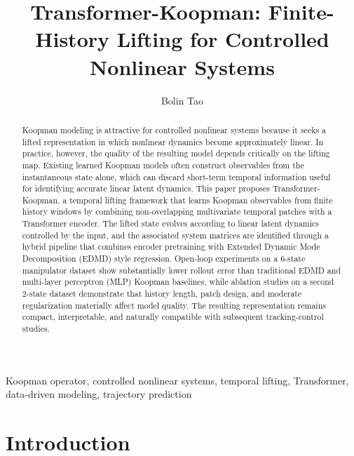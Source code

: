 \documentclass[journal]{IEEEtran}
\begin{document}
\title{Transformer-Koopman: Finite-History Lifting for Controlled Nonlinear Systems}

\author{Bolin Tao}


\maketitle

\begin{abstract}
Koopman modeling is attractive for controlled nonlinear systems because it seeks a lifted representation in which nonlinear dynamics become approximately linear. In practice, however, the quality of the resulting model depends critically on the lifting map. Existing learned Koopman models often construct observables from the instantaneous state alone, which can discard short-term temporal information useful for identifying accurate linear latent dynamics. This paper proposes Transformer-Koopman, a temporal lifting framework that learns Koopman observables from finite history windows by combining non-overlapping multivariate temporal patches with a Transformer encoder. The lifted state evolves according to linear latent dynamics controlled by the input, and the associated system matrices are identified through a hybrid pipeline that combines encoder pretraining with Extended Dynamic Mode Decomposition (EDMD) style regression. Open-loop experiments on a 6-state manipulator dataset show substantially lower rollout error than traditional EDMD and multi-layer perceptron (MLP) Koopman baselines, while ablation studies on a second 2-state dataset demonstrate that history length, patch design, and moderate regularization materially affect model quality. The resulting representation remains compact, interpretable, and naturally compatible with subsequent tracking-control studies.
\end{abstract}



\begin{IEEEkeywords}
Koopman operator, controlled nonlinear systems, temporal lifting, Transformer, data-driven modeling, trajectory prediction
\end{IEEEkeywords}

\section{Introduction}
\label{sec:introduction}
\end{document}
